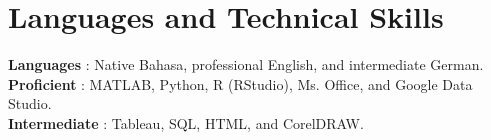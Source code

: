 \documentclass[letterpaper,11pt]{article}
\makeatletter
\newcommand{\resumeItem}[1]{
	\item\small{
		{#1 \vspace{-2pt}}
	}
}
\newcommand{\resumeSubheading}[4]{
	\vspace{-2pt}\item
	\begin{tabular*}{1.0\textwidth}[t]{l@{\extracolsep{\fill}}r}
		\textbf{#1} & \textbf{\small #2} \\
		\textit{\small#3} & \textit{\small #4} \\
	\end{tabular*}\vspace{-7pt}
}
\newcommand{\resumeSubHeadingListStart}{\begin{itemize}[leftmargin=0.0in, label={}]}
\newcommand{\resumeSubHeadingListEnd}{\end{itemize}}
\newcommand{\resumeItemListStart}{\begin{itemize}}
\newcommand{\resumeItemListEnd}{\end{itemize}\vspace{-5pt}}
\makeatother
\begin{document}
	
	\section{Languages and Technical Skills}
	\begin{itemize}[leftmargin=0.15in, label={}]
		\small{\item{
				\textbf{Languages}{ : Native Bahasa, professional English, and intermediate German. } \\
				\textbf{Proficient}{ : MATLAB, Python, R (RStudio), Ms. Office, and Google Data Studio.} \\
				\textbf{Intermediate}{ : Tableau,  SQL, HTML, and CorelDRAW.} \\
		}}
	\end{itemize}
	\vspace{-16pt}
	
	
	
	
	
\end{document}
